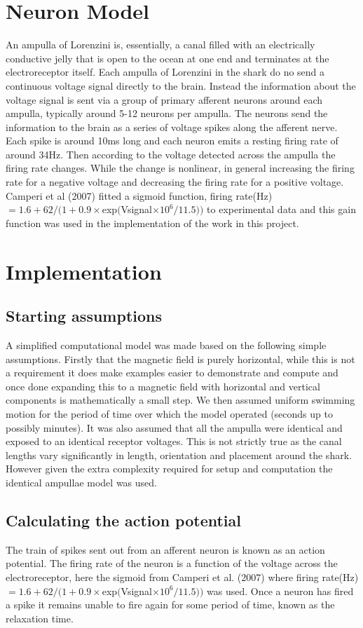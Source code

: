 \documentclass[12pt]{article}
\begin{document}
\section{Neuron Model}
An ampulla of Lorenzini is, essentially, a canal filled with an electrically conductive jelly that is open to the ocean at one end and terminates at the electroreceptor itself. Each ampulla of Lorenzini in the shark do no send a continuous voltage signal directly to the brain. Instead the information about the voltage signal is sent via a group of primary afferent neurons around each ampulla, typically around 5-12 neurons per ampulla\cite{Murray:1974}. The neurons send the information to the brain as a series of voltage spikes along the afferent nerve. Each spike is around 10ms long and each neuron emits a resting firing rate of around 34Hz\cite{Camperi:2007}. Then according to the voltage detected across the ampulla the firing rate changes. While the change is nonlinear, in general increasing the firing rate for a negative voltage and decreasing the firing rate for a positive voltage. Camperi et al (2007) fitted a sigmoid function, firing rate(Hz)$ = 1.6 + 62/(1 + 0.9\times $exp$($Vsignal$\times 10^6/11.5))$ to experimental data and this gain function was used in the implementation of the work in this project.


\section{Implementation}
\subsection{Starting assumptions}
A simplified computational model was made based on the following simple assumptions. Firstly that the magnetic field is purely horizontal, while this is not a requirement it does make examples easier to demonstrate and compute and once done expanding this to a magnetic field with horizontal and vertical components is mathematically a small step. We then assumed uniform swimming motion for the period of time over which the model operated (seconds up to possibly minutes). It was also assumed that all the ampulla were identical and exposed to an identical receptor voltages. This is not strictly true as the canal lengths vary significantly in length, orientation and placement around the shark. However given the extra complexity required for setup and computation the identical ampullae model was used. 

\subsection{Calculating the action potential}
The train of spikes sent out from an afferent neuron is known as an action potential. The firing rate of the neuron is a function of the voltage across the electroreceptor, here the sigmoid from Camperi et al. (2007) where firing rate(Hz)$ = 1.6 + 62/(1 + 0.9\times $exp$($Vsignal$\times 10^6/11.5))$ was used. Once a neuron has fired a spike it remains unable to fire again for some period of time, known as the relaxation time.
\end{document}
